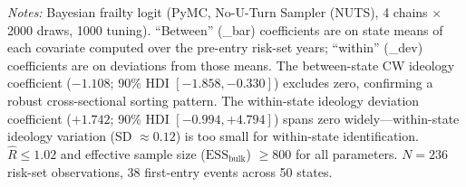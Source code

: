 \documentclass[12pt]{article}
\begin{document}
\begin{appendices}
\begin{table}[htbp]
\centering
\begin{threeparttable}
\caption{Bayesian Frailty Stage 1: Within/Between Decomposition of Ideology and Cattle Effects}
\label{tab:within_between_frailty}

\begin{tablenotes}[flushleft]
\footnotesize
\item \textit{Notes:} Bayesian frailty logit (PyMC, No-U-Turn Sampler (NUTS), 4 chains $\times$ 2000 draws, 1000 tuning).  ``Between'' (\_bar) coefficients are on state means of each covariate computed over the pre-entry risk-set years; ``within'' (\_dev) coefficients are on deviations from those means.  The between-state CW ideology coefficient ($-1.108$; 90\% HDI $[-1.858, -0.330]$) excludes zero, confirming a robust cross-sectional sorting pattern.  The within-state ideology deviation coefficient ($+1.742$; 90\% HDI $[-0.994, +4.794]$) spans zero widely---within-state ideology variation (SD $\approx 0.12$) is too small for within-state identification.  $\hat{R} \leq 1.02$ and effective sample size ($\text{ESS}_{\text{bulk}}$) $\geq 800$ for all parameters.  $N = 236$ risk-set observations, 38 first-entry events across 50 states.
\end{tablenotes}
\end{threeparttable}
\end{table}






\end{appendices}
\end{document}
